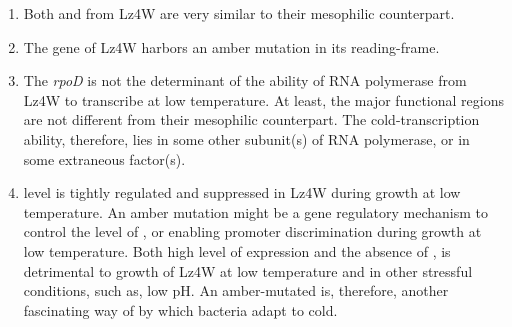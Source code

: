 \begin{enumerate}

\item Both  and  from  Lz4W are
very similar to their meso\-philic counterpart.

\item The  gene of  Lz4W harbors an amber
mutation in its reading-frame.

\item The \emph{rpoD} is not the determinant of the ability of RNA
polymerase from  Lz4W to transcribe at low temperature.
At least, the major functional regions are not different from
their mesophilic counterpart. The cold-transcription ability,
therefore, lies in some other subunit(s) of RNA polymerase, or in
some extraneous factor(s).

\item \sigs{} level is tightly regulated and suppressed in Lz4W
during growth at low temperature. An amber mutation might be a
gene regulatory mechanism to control the level of \sigs{}, or
enabling promoter discrimination during growth at low temperature.
Both high level of expression and the absence of \sigs{}, is
detrimental to growth of  Lz4W at low temperature and in
other stressful conditions, such as, low pH\@. An amber-mutated
\sigs{} is, therefore, another fascinating way of by which
bacteria adapt to cold. 

\end{enumerate}
